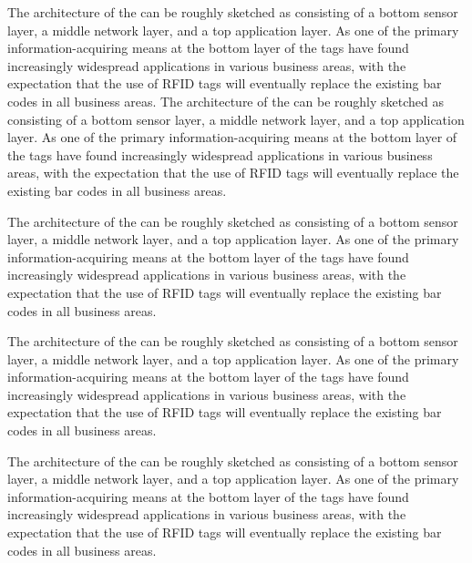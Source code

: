\documentclass[10pt]{ietbook}
\begin{document}
The architecture of the can be roughly sketched
as consisting of a bottom sensor layer, a middle network layer, and a
top application layer. As one of the primary information-acquiring means
at the bottom layer of the
tags have found increasingly widespread applications in various business
areas, with the expectation that the use of RFID tags will eventually
replace the existing bar codes in all business areas.
The architecture of the can be roughly sketched
as consisting of a bottom sensor layer, a middle network layer, and a
top application layer. As one of the primary information-acquiring means
at the bottom layer of the
tags have found increasingly widespread applications in various business
areas, with the expectation that the use of RFID tags will eventually
replace the existing bar codes in all business areas.

The architecture of the can be roughly sketched
as consisting of a bottom sensor layer, a middle network layer, and a
top application layer. As one of the primary information-acquiring means
at the bottom layer of the
tags have found increasingly widespread applications in various business
areas, with the expectation that the use of RFID tags will eventually
replace the existing bar codes in all business areas.

The architecture of the can be roughly sketched
as consisting of a bottom sensor layer, a middle network layer, and a
top application layer. As one of the primary information-acquiring means
at the bottom layer of the
tags have found increasingly widespread applications in various business
areas, with the expectation that the use of RFID tags will eventually
replace the existing bar codes in all business areas.

The architecture of the can be roughly sketched
as consisting of a bottom sensor layer, a middle network layer, and a
top application layer. As one of the primary information-acquiring means
at the bottom layer of the
tags have found increasingly widespread applications in various business
areas, with the expectation that the use of RFID tags will eventually
replace the existing bar codes in all business areas.
\end{document}
